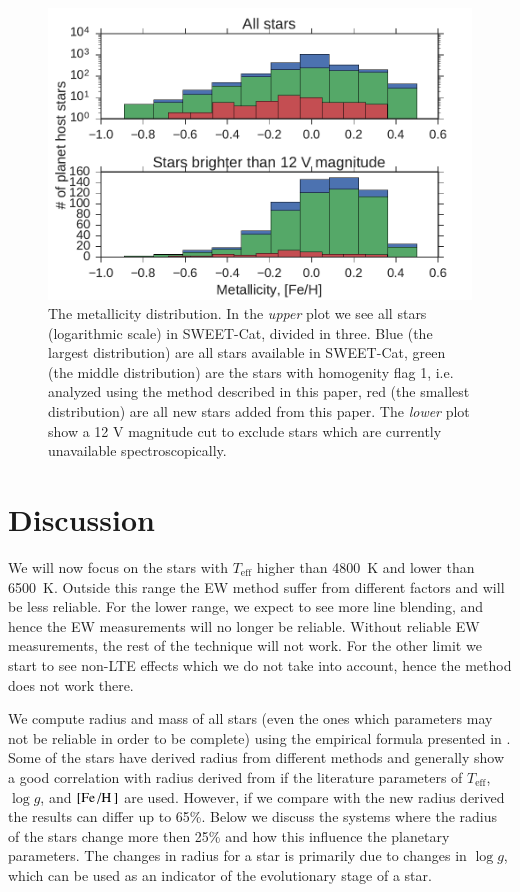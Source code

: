 \documentclass{aa}
\begin{document}
\begin{figure}[tpb]
    \centering
    \includegraphics[width=1.0\linewidth,natwidth=450,natheight=300]{figures/metallicityDistribution.pdf}
    \caption{The metallicity distribution. In the \emph{upper} plot we see all
             stars (logarithmic scale) in SWEET-Cat, divided in three. Blue
             (the largest distribution) are all stars available in SWEET-Cat,
             green (the middle distribution) are the stars with homogenity flag
             1, i.e. analyzed using the method described in this paper, red
             (the smallest distribution) are all new stars added from this
             paper. The \emph{lower} plot show a 12 V magnitude cut to exclude
             stars which are currently unavailable spectroscopically.}
    \label{fig:distribution}
\end{figure}



\section{Discussion}
\label{sec:Discussion}
We will now focus on the stars with $T_\mathrm{eff}$ higher than \SI{4800}{K}
and lower than \SI{6500}{K}. Outside this range the EW method suffer from
different factors and will be less reliable. For the lower range, we expect to
see more line blending, and hence the EW measurements will no longer be
reliable. Without reliable EW measurements, the rest of the technique will not
work. For the other limit we start to see non-LTE effects which we do not take
into account, hence the method does not work there.

We compute radius and mass of all stars (even the ones which parameters may not
be reliable in order to be complete) using the empirical formula presented in
\citet{Torres2010}. Some of the stars have derived radius from different methods
and generally show a good correlation with radius derived from
\citet{Torres2010} if the literature parameters of $T_\mathrm{eff}$, $\log g$,
and $[\ion{Fe}/\ion{H}]$ are used. However, if we compare with the new radius
derived the results can differ up to 65\%. Below we discuss the systems where
the radius of the stars change more then 25\% and how this influence the
planetary parameters. The changes in radius for a star is primarily due to
changes in $\log g$, which can be used as an indicator of the evolutionary stage
of a star.
\end{document}
